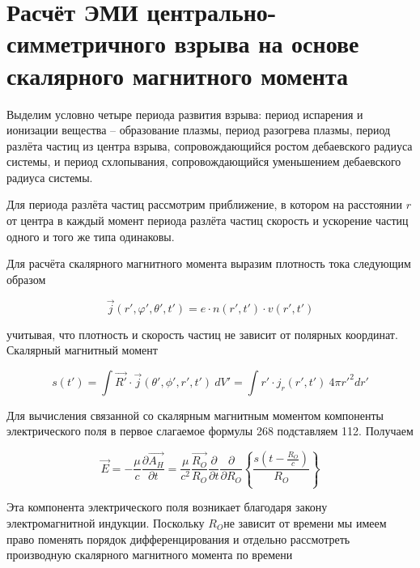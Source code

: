 \documentclass[11pt]{article}
\begin{document}
\section*{Расчёт ЭМИ центрально-симметричного взрыва на основе скалярного
магнитного момента}

Выделим условно четыре периода развития взрыва:
период испарения и ионизации вещества -- образование плазмы, период
разогрева плазмы, период разлёта частиц из центра взрыва,
сопровождающийся ростом дебаевского радиуса системы, и период
схлопывания, сопровождающийся уменьшением дебаевского радиуса системы.

Для периода разлёта частиц рассмотрим приближение, в котором на
расстоянии \(r\) от центра в каждый момент периода разлёта частиц скорость и
ускорение частиц одного и того же типа одинаковы.

Для расчёта скалярного
магнитного момента выразим плотность тока следующим образом

\begin{equation}
\overrightarrow{j}\left( r',\varphi ',\theta ',t'
\right)=e\cdot n\left( r',t' \right)\cdot v\left( r',t' \right)
\end{equation}

учитывая, что плотность и скорость частиц не зависит от полярных
координат. Скалярный магнитный момент

\begin{equation}s\left( t' \right)=\int{\overrightarrow{R'}\cdot \overrightarrow{j}\left( \theta ',\phi ',r',t' \right)}~dV'=\int{r'\cdot {{j}_{r}}\left( r',t' \right)}~4\pi r{{'}^{2}}dr'
\end{equation}

Для вычисления связанной со скалярным магнитным моментом компоненты
электрического поля в первое слагаемое формулы 268 подставляем 112.
Получаем

\begin{equation}
\overrightarrow{E}=-\frac{\mu }{c}\frac{\partial \overrightarrow{{{A}_{H}}}}{\partial t}=\frac{\mu }{{{c}^{2}}}\frac{\overrightarrow{{{R}_{O}}}}{{{R}_{O}}}\frac{\partial }{\partial t}\frac{\partial }{\partial {{R}_{O}}}\left\{
\frac{s\left( t-\frac{{{R}_{O}}}{c} \right)}{{{R}_{O}}} \right\}
\end{equation}

Эта компонента электрического поля возникает благодаря закону
электромагнитной индукции. Поскольку \({{R}_{O}}\)не зависит от времени
мы имеем право поменять порядок дифференцирования и отдельно рассмотреть
производную скалярного магнитного момента по времени
\end{document}
